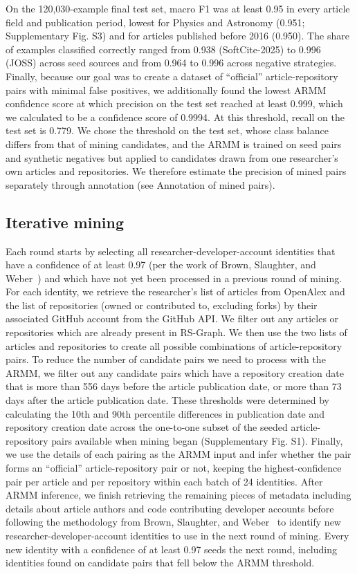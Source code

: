 \documentclass[pdflatex,sn-nature]{sn-jnl}%
\begin{document}
On the 120,030-example final test set, macro F1 was at least 0.95 in every article field and publication period, lowest for Physics and Astronomy (0.951; Supplementary Fig. S3) and for articles published before 2016 (0.950).
The share of examples classified correctly ranged from 0.938 (SoftCite-2025) to 0.996 (JOSS) across seed sources and from 0.964 to 0.996 across negative strategies.
Finally, because our goal was to create a dataset of ``official'' article-repository pairs with minimal false positives, we additionally found the lowest ARMM confidence score at which precision on the test set reached at least 0.999, which we calculated to be a confidence score of 0.9994.
At this threshold, recall on the test set is 0.779.
We chose the threshold on the test set, whose class balance differs from that of mining candidates, and the ARMM is trained on seed pairs and synthetic negatives but applied to candidates drawn from one researcher's own articles and repositories.
We therefore estimate the precision of mined pairs separately through annotation (see Annotation of mined pairs).

\subsection{Iterative mining}\label{subsec:m-mining}

Each round starts by selecting all researcher-developer-account identities that have a confidence of at least 0.97 (per the work of Brown, Slaughter, and Weber~\cite{brown2026code}) and which have not yet been processed in a previous round of mining.
For each identity, we retrieve the researcher's list of articles from OpenAlex and the list of repositories (owned or contributed to, excluding forks) by their associated GitHub account from the GitHub API.
We filter out any articles or repositories which are already present in RS-Graph.
We then use the two lists of articles and repositories to create all possible combinations of article-repository pairs.
To reduce the number of candidate pairs we need to process with the ARMM, we filter out any candidate pairs which have a repository creation date that is more than 556 days before the article publication date, or more than 73 days after the article publication date.
These thresholds were determined by calculating the 10th and 90th percentile differences in publication date and repository creation date across the one-to-one subset of the seeded article-repository pairs available when mining began (Supplementary Fig. S1).
Finally, we use the details of each pairing as the ARMM input and infer whether the pair forms an ``official'' article-repository pair or not, keeping the highest-confidence pair per article and per repository within each batch of 24 identities.
After ARMM inference, we finish retrieving the remaining pieces of metadata including details about article authors and code contributing developer accounts before following the methodology from Brown, Slaughter, and Weber~\cite{brown2026code} to identify new researcher-developer-account identities to use in the next round of mining.
Every new identity with a confidence of at least 0.97 seeds the next round, including identities found on candidate pairs that fell below the ARMM threshold.
\end{document}
